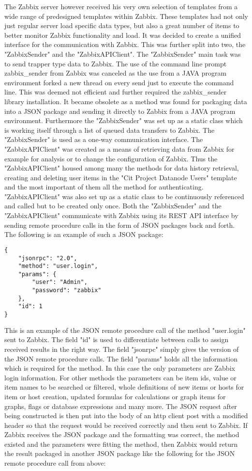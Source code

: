 	The Zabbix server however received his very own selection of templates from a wide range of predesigned templates within Zabbix. These templates had not only just regular server load specific data types, but also a great number of items to better monitor Zabbix functionality and load.
	It was decided to create a unified interface for the communication with Zabbix. This was further split into two, the "ZabbixSender" and the "ZabbixAPIClient". The "ZabbixSender" main task was to send trapper type data to Zabbix. The use of the command line prompt zabbix\_sender from Zabbix was canceled as the use from a JAVA program environment forked a new thread on every send just to execute the command line. This was deemed not efficient and further required the zabbix\_sender library installation. It became obsolete as a method was found for packaging data into a JSON package and sending it directly to Zabbix from a JAVA program environment. Furthermore the "ZabbixSender" was set up as a static class which is working itself through a list of queued data transfers to Zabbix. The "ZabbixSender" is used as a one-way communication interface. The "ZabbixAPIClient" was created as a means of retrieving data from Zabbix for example for analysis or to change the configuration of Zabbix. Thus the "ZabbixAPIClient" housed among many the methods for data history retrieval, creating and deleting user items in the "Cit Project Datanode Users" template and the most important of them all the method for authenticating. "ZabbixAPIClient" was also set up as a static class to be continuously referenced and called but to be created only once. Both the "ZabbixSender" and the "ZabbixAPIClient" communicate with Zabbix using its REST API interface by sending remote procedure calls in the form of JSON packages back and forth.
The following is an example of such a JSON package\cite{zab3}:
\begin{lstlisting}[language=json_sw]
{
    "jsonrpc": "2.0",
    "method": "user.login",
    "params": {
        "user": "Admin",
        "password": "zabbix"
    },
    "id": 1
}\end{lstlisting} 
	This is an example of the JSON remote procedure call of the method "user.login" sent to Zabbix. The field "id" is used to differentiate between calls to assign received results in the right way. The field "jsonrpc" simply gives the version of the JSON remote procedure calls. The field "params" holds all the information which is required for the method. In this case the only parameters are Zabbix login information. For other methods the parameters can be item ids, value or item names to be searched or filtered, whole definitions of new items or hosts for item or host creation, updated formulas for calculations or graph items for graphs, flags or database expressions and many more. The JSON request after being constructed is then put into the body of an http client post with a modified header so that the request would be received correctly and then sent to Zabbix. If Zabbix receives the JSON package and the formatting was correct, the method existed and the parameters were fitting the method, then Zabbix would return the result packaged in another JSON package like the following\cite{zab3} for the JSON remote procedure call from above:
